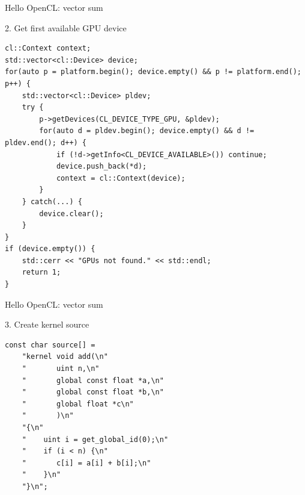 \documentclass[@BEAMER_OPTIONS@]{beamer}
\begin{document}

\begin{frame}[fragile]{Hello OpenCL: vector sum}
    \begin{exampleblock}{2. Get first available GPU device}
        \begin{lstlisting}[firstnumber=last]
cl::Context context;
std::vector<cl::Device> device;
for(auto p = platform.begin(); device.empty() && p != platform.end(); p++) {
    std::vector<cl::Device> pldev;
    try {
        p->getDevices(CL_DEVICE_TYPE_GPU, &pldev);
        for(auto d = pldev.begin(); device.empty() && d != pldev.end(); d++) {
            if (!d->getInfo<CL_DEVICE_AVAILABLE>()) continue;
            device.push_back(*d);
            context = cl::Context(device);
        }
    } catch(...) {
        device.clear();
    }
}
if (device.empty()) {
    std::cerr << "GPUs not found." << std::endl;
    return 1;
}
        \end{lstlisting}
    \end{exampleblock}
\end{frame}


\begin{frame}[fragile]{Hello OpenCL: vector sum}
    \begin{exampleblock}{3. Create kernel source}
        \begin{lstlisting}[firstnumber=last]
const char source[] =
    "kernel void add(\n"
    "       uint n,\n"
    "       global const float *a,\n"
    "       global const float *b,\n"
    "       global float *c\n"
    "       )\n"
    "{\n"
    "    uint i = get_global_id(0);\n"
    "    if (i < n) {\n"
    "       c[i] = a[i] + b[i];\n"
    "    }\n"
    "}\n";
        \end{lstlisting}
    \end{exampleblock}
\end{frame}
\end{document}
